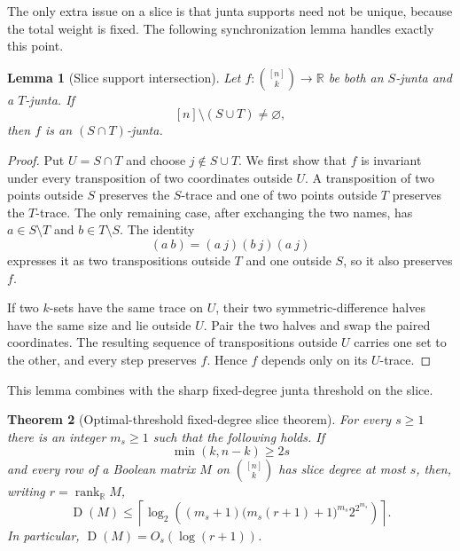 \documentclass[11pt]{article}
\newtheorem{theorem}{Theorem}[section]
\newtheorem{lemma}[theorem]{Lemma}
\theoremstyle{definition}
\theoremstyle{remark}
\newcommand{\R}{\mathbb R}
\newcommand{\1}{\mathbf 1}
\newcommand{\rank}{\operatorname{rank}}
\newcommand{\Dcc}{\operatorname{D}}
\begin{document}
The only extra issue on a slice is that junta supports need not be unique,
because the total weight is fixed.  The following synchronization lemma
handles exactly this point.

\begin{lemma}[Slice support intersection]
\label{lem:slice-support-intersection}
Let $f:\binom{[n]}k\to\R$ be both an $S$-junta and a $T$-junta.  If
\[
 [n]\setminus(S\cup T)\ne\varnothing,
\]
then $f$ is an $(S\cap T)$-junta.
\end{lemma}

\begin{proof}
Put $U=S\cap T$ and choose $j\notin S\cup T$.  We first show that $f$ is
invariant under every transposition of two coordinates outside $U$.  A
transposition of two points outside $S$ preserves the $S$-trace and one of
two points outside $T$ preserves the $T$-trace.  The only remaining case,
after exchanging the two names, has
$a\in S\setminus T$ and $b\in T\setminus S$.  The identity
\[
 (a\ b)=(a\ j)(b\ j)(a\ j)
\]
expresses it as two transpositions outside $T$ and one outside $S$, so it
also preserves $f$.

If two $k$-sets have the same trace on $U$, their two symmetric-difference
halves have the same size and lie outside $U$.  Pair the two halves and swap
the paired coordinates.  The resulting sequence of transpositions outside
$U$ carries one set to the other, and every step preserves $f$.  Hence $f$
depends only on its $U$-trace.
\end{proof}

This lemma combines with the sharp fixed-degree junta threshold on the slice.

\begin{theorem}[Optimal-threshold fixed-degree slice theorem]
\label{thm:fixed-degree-slice}
For every $s\ge1$ there is an integer $m_s\ge1$ such that the following
holds.  If
\[
 \min(k,n-k)\ge2s
\]
and every row of a Boolean matrix $M$ on $\binom{[n]}k$ has slice degree at
most $s$, then, writing $r=\rank_{\R}M$,
\[
 \Dcc(M)\le
 \left\lceil\log_2\left(
 (m_s+1)\bigl(m_s(r+1)+1\bigr)^{m_s}2^{2^{m_s}}
 \right)\right\rceil.
\]
In particular, $\Dcc(M)=O_s(\log(r+1))$.
\end{theorem}
\end{document}

